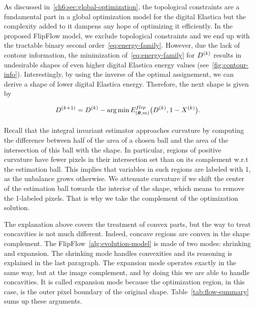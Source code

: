 As discussed in~\cref{ch6:sec:global-optimization}, the topological constraints are a fundamental part in a global optimization model for the digital Elastica but the complexity added to it dampens any hope of optimizing it efficiently. In the proposed FlipFlow model, we exclude topological constraints and we end up with the tractable binary second order~\cref{eq:energy-family}. However, due the lack of contour information, the minimization of~\cref{eq:energy-family} for $D^{(k)}$ results in undesirable shapes of even higher digital Elastica energy values  (see~\cref{fig:contour-info}). Interestingly, by using the inverse of the optimal assignement, we can derive a shape of lower digital Elastica energy. Therefore, the next shape is given by

\begin{align*}
	D^{(k+1)} = D^{(k)} - \operatorname*{arg\,min} _{}{E_{(\bm{\theta},m)}^{flip}\big(D^{(k)},1-X^{(k)}} \big).
\end{align*}

Recall that the integral invariant estimator approaches curvature by computing the difference between half of the area
of a chosen ball and the area of the intersection of this ball with the shape.  In particular, regions of positive
curvature have fewer pixels in their intersection set than on its complement w.r.t the estimation ball. This implies
that variables in such regions are labeled with 1, as the unbalance grows otherwise. We attenuate curvature if we shift
the center of the estimation ball towards the interior of the shape, which means to remove the 1-labeled pixels. That is
why we take the complement of the optimization solution.


The explanation above covers the treatment of convex parts, but the way to treat concavities is not much different. Indeed, concave regions are convex in the shape complement. The FlipFlow~\cref{alg:evolution-model} is made of two modes: shrinking and expansion. The shrinking mode handles convexities and its reasoning is explained in the last paragraph. The expansion mode operates exactly in the same way, but at the image complement, and by doing this we are able to handle
concavities. It is called expansion mode because the optimization region, in this case, is the outer pixel boundary of
the original shape. Table~\cref{tab:flow-summary} sums up these arguments.

%
	

